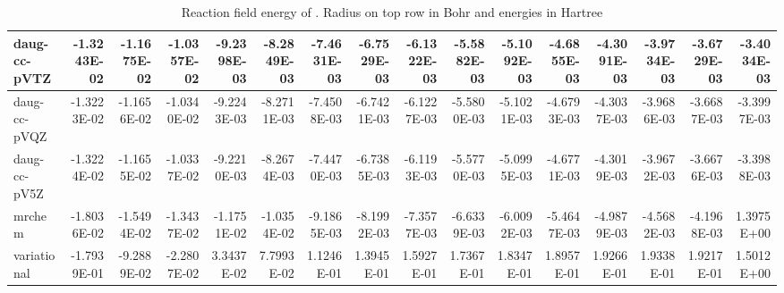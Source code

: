 \documentclass[../master_thesis.tex]{subfiles}
\begin{document}
\begin{table}
{{\begin{tabular}{|l|r|r|r|r|r|r|r|r|r|r|r|r|r|r|r|}
    daug-cc-pVTZ & -1.3243E-02 & -1.1675E-02 & -1.0357E-02 & -9.2398E-03 & -8.2849E-03 & -7.4631E-03 & -6.7529E-03 & -6.1322E-03 & -5.5882E-03 & -5.1092E-03 & -4.6855E-03 & -4.3091E-03 & -3.9734E-03 & -3.6729E-03 & -3.4034E-03 \\ \hline
    daug-cc-pVQZ & -1.3223E-02 & -1.1656E-02 & -1.0340E-02 & -9.2243E-03 & -8.2711E-03 & -7.4508E-03 & -6.7421E-03 & -6.1227E-03 & -5.5800E-03 & -5.1021E-03 & -4.6793E-03 & -4.3037E-03 & -3.9686E-03 & -3.6687E-03 & -3.3997E-03 \\ \hline
    daug-cc-pV5Z & -1.3224E-02 & -1.1655E-02 & -1.0337E-02 & -9.2210E-03 & -8.2674E-03 & -7.4470E-03 & -6.7385E-03 & -6.1193E-03 & -5.5770E-03 & -5.0995E-03 & -4.6771E-03 & -4.3019E-03 & -3.9672E-03 & -3.6676E-03 & -3.3988E-03 \\ \hline
    mrchem & -1.8036E-02 & -1.5494E-02 & -1.3437E-02 & -1.1751E-02 & -1.0354E-02 & -9.1865E-03 & -8.1992E-03 & -7.3577E-03 & -6.6339E-03 & -6.0092E-03 & -5.4647E-03 & -4.9879E-03 & -4.5682E-03 & -4.1968E-03 & 1.3975E+00 \\ \hline
    variational & -1.7939E-01 & -9.2889E-02 & -2.2807E-02 & 3.3437E-02 & 7.7993E-02 & 1.1246E-01 & 1.3945E-01 & 1.5927E-01 & 1.7367E-01 & 1.8347E-01 & 1.8957E-01 & 1.9266E-01 & 1.9338E-01 & 1.9217E-01 & 1.5012E+00 \\ \hline
    \end{tabular}}}{  \caption{Reaction field energy of . Radius on top row in Bohr and energies in Hartree}\label{tab:Erdatawat}}


\end{table}
\end{document}
